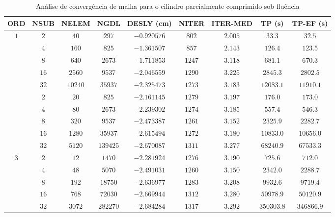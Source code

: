 \documentclass[Tese.tex]{subfiles}
\begin{document}
{\begin{table}[!h]
	\centering
	\scriptsize
	\caption{Análise de convergência de malha para o cilindro parcialmente comprimido sob fluência}
	\label{tab:convergence-mesh}
	{\renewcommand{\arraystretch}{1.2}
		\begin{tabular}{ccccccccc}
			\hline
			ORD & NSUB & NELEM & NGDL & DESLY (cm) & NITER & ITER-MED & TP (s) & TP-EF (s)\\ \hline
			\multirow{6}{*}{$1$} 
			& $2 $ & $   40$ & $   297$ & $-0.920576$ & $ 802$ & $2.005$ & $     33.3$ & $    32.5$ \\
			& $4 $ & $  160$ & $   825$ & $-1.361507$ & $ 857$ & $2.143$ & $    126.4$ & $   123.5$ \\
			& $8 $ & $  640$ & $  2673$ & $-1.711853$ & $1247$ & $3.118$ & $    681.1$ & $   670.3$ \\
			& $16$ & $ 2560$ & $  9537$ & $-2.046559$ & $1290$ & $3.225$ & $   2845.3$ & $  2802.5$ \\
			& $32$ & $10240$ & $ 35937$ & $-2.325473$ & $1273$ & $3.183$ & $  12083.1$ & $ 11910.1$ \\ \hline
			\multirow{6}{*}{$2$} 
			& $2 $ & $   20$ & $   825$ & $-2.161145$ & $1279$ & $3.197$ & $    176.0$ & $   173.0$ \\
			& $4 $ & $   80$ & $  2673$ & $-2.239302$ & $1274$ & $3.185$ & $    557.4$ & $   546.3$ \\
			& $8 $ & $  320$ & $  9537$ & $-2.473387$ & $1261$ & $3.152$ & $   2325.9$ & $  2282.7$ \\
			& $16$ & $ 1280$ & $ 35937$ & $-2.615494$ & $1272$ & $3.180$ & $  10833.0$ & $ 10656.0$ \\
			& $32$ & $ 5120$ & $139425$ & $-2.670087$ & $1311$ & $3.277$ & $  68240.9$ & $ 67533.3$ \\ \hline
			\multirow{6}{*}{$3$} 
			& $2 $ & $   12$ & $  1470$ & $-2.281924$ & $1276$ & $3.190$ & $    725.6$ & $   712.0$ \\
			& $4 $ & $   48$ & $  5070$ & $-2.491031$ & $1260$ & $3.150$ & $   2342.0$ & $  2288.7$ \\
			& $8 $ & $  192$ & $ 18750$ & $-2.636977$ & $1283$ & $3.208$ & $   9932.6$ & $  9719.4$ \\
			& $16$ & $  768$ & $ 72030$ & $-2.669944$ & $1312$ & $3.280$ & $  50978.9$ & $ 50120.9$ \\
			& $32$ & $ 3072$ & $282270$ & $-2.684284$ & $1317$ & $3.292$ & $ 350303.8$ & $346866.9$ \\ \hline
			

\end{tabular}}
\end{table}}
\end{document}
